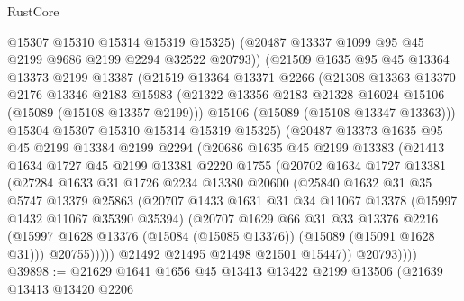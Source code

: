 \begin{lexlean}{RustCore}
\begin{coremodule}
            @15307
            @15310
            @15314
            @15319
            @15325)
          (@20487 @13337 @1099 @95 @45 @2199 @9686 @2199 @2294 @32522 @20793))
        (@21509
          @1635
          @95
          @45
          @13364
          @13373
          @2199
          @13387
          (@21519
            @13364
            @13371
            @2266
            (@21308
              @13363
              @13370
              @2176
              @13346
              @2183
              @15983
              (@21322 @13356 @2183 @21328 @16024 @15106 (@15089 (@15108 @13357 @2199)))
              @15106
              (@15089 (@15108 @13347 @13363)))
            @15304
            @15307
            @15310
            @15314
            @15319
            @15325)
          (@20487
            @13373
            @1635
            @95
            @45
            @2199
            @13384
            @2199
            @2294
            (@20686
              @1635
              @45
              @2199
              @13383
              (@21413
                @1634
                @1727
                @45
                @2199
                @13381
                @2220
                @1755
                (@20702
                  @1634
                  @1727
                  @13381
                  (@27284
                    @1633
                    @31
                    @1726
                    @2234
                    @13380
                    @20600
                    (@25840
                      @1632
                      @31
                      @35
                      @5747
                      @13379
                      @25863
                      (@20707
                        @1433
                        @1631
                        @31
                        @34
                        @11067
                        @13378
                        (@15997 @1432 @11067 @35390 @35394)
                        (@20707
                          @1629
                          @66
                          @31
                          @33
                          @13376
                          @2216
                          (@15997 @1628 @13376 (@15084 (@15085 @13376)) (@15089 (@15091 @1628 @31)))
                          @20755)))))
                @21492
                @21495
                @21498
                @21501
                @15447))
            @20793))))
@39898 := @21629
    @1641
    @1656
    @45
    @13413
    @13422
    @2199
    @13506
    (@21639
      @13413
      @13420
      @2206

\end{coremodule}
\end{lexlean}
